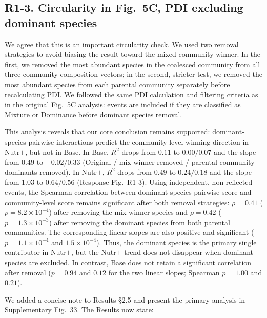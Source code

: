 \subsection*{R1-3. Circularity in Fig.~5C, PDI excluding dominant species}


\responselabel
We agree that this is an important circularity check. We used two removal strategies to avoid biasing the result toward the mixed-community winner. In the first, we removed the most abundant species in the coalesced community from all three community composition vectors; in the second, stricter test, we removed the most abundant species from each parental community separately before recalculating PDI. We followed the same PDI calculation and filtering criteria as in the original Fig.~5C analysis: events are included if they are classified as Mixture or Dominance before dominant species removal.

This analysis reveals that our core conclusion remains supported: dominant-species pairwise interactions predict the community-level winning direction in Nutr$+$, but not in Base. In Base, $R^2$ drops from $0.11$ to $0.00 / 0.07$ and the slope from $0.49$ to $-0.02 / 0.33$ (Original / mix-winner removed / parental-community dominants removed). In Nutr$+$, $R^2$ drops from $0.49$ to $0.24 / 0.18$ and the slope from $1.03$ to $0.64 / 0.56$ (Response Fig.~R1-3). Using independent, non-reflected events, the Spearman correlation between dominant-species pairwise score and community-level score remains significant after both removal strategies: $\rho = 0.41$ ($p = 8.2 \times 10^{-4}$) after removing the mix-winner species and $\rho = 0.42$ ($p = 1.3 \times 10^{-3}$) after removing the dominant species from both parental communities. The corresponding linear slopes are also positive and significant ($p = 1.1 \times 10^{-4}$ and $1.5 \times 10^{-4}$). Thus, the dominant species is the primary single contributor in Nutr$+$, but the Nutr$+$ trend does not disappear when dominant species are excluded. In contrast, Base does not retain a significant correlation after removal ($p = 0.94$ and $0.12$ for the two linear slopes; Spearman $p = 1.00$ and $0.21$).

We added a concise note to Results \S2.5 and present the primary analysis in Supplementary Fig.~33. The Results now state: 

